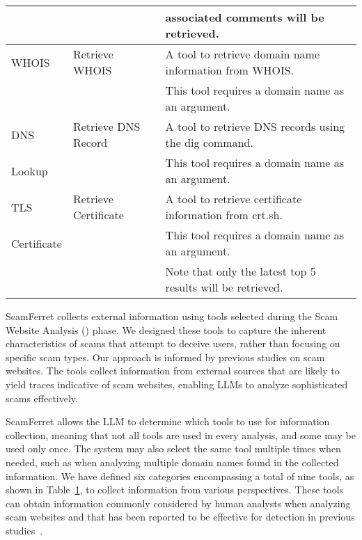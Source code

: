 \documentclass[runningheads]{llncs}
\begin{document}
\begin{table}[!t]
{\begin{tabular}{lll}
& & associated comments will be retrieved.\\ \midrule
WHOIS & Retrieve WHOIS & A tool to retrieve domain name information from WHOIS. \\
& & This tool requires a domain name as an argument. \\ \midrule
DNS & Retrieve DNS Record & A tool to retrieve DNS records using the dig command. \\
Lookup & & This tool requires a domain name as an argument. \\ \midrule
TLS  & Retrieve Certificate & A tool to retrieve certificate information from crt.sh. \\
Certificate & & This tool requires a domain name as an argument. \\
& & Note that only the latest top 5 results will be retrieved. \\
\bottomrule
\end{tabular}
}
\label{tab:tools}
\end{table}

ScamFerret collects external information using tools selected during the Scam Website Analysis () phase.
We designed these tools to capture the inherent characteristics of scams that attempt to deceive users, rather than focusing on specific scam types.
Our approach is informed by previous studies on scam websites.
The tools collect information from external sources that are likely to yield traces indicative of scam websites, enabling LLMs to analyze sophisticated scams effectively.

ScamFerret allows the LLM to determine which tools to use for information collection, meaning that not all tools are used in every analysis, and some may be used only once.
The system may also select the same tool multiple times when needed, such as when analyzing multiple domain names found in the collected information.
We have defined six categories encompassing a total of nine tools, as shown in Table~\ref{tab:tools}, to collect information from various perspectives.
These tools can obtain information commonly considered by human analysts when analyzing scam websites and that has been reported to be effective for detection in previous studies~\cite{DBLP:conf/sp/BitaabCOLWAWBSD23,DBLP:conf/acsac/KotziasRPSB23,DBLP:conf/ndss/LiYN23}.
\end{document}
